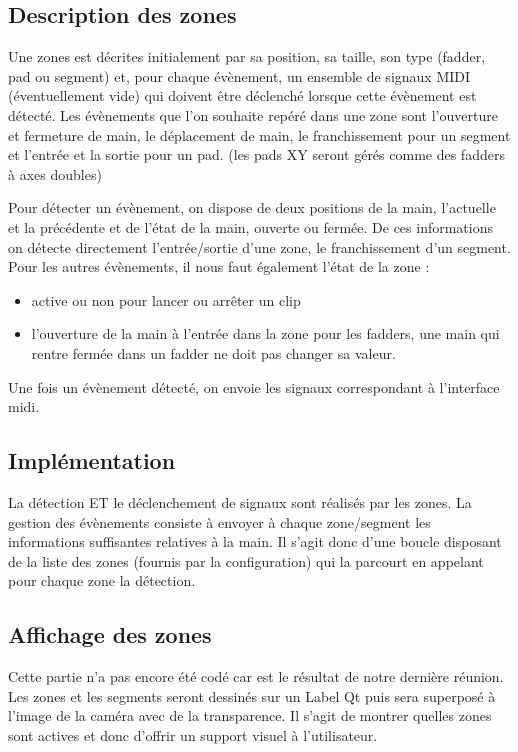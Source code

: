 \subsection{Description des zones}
\par Une zones est décrites initialement par sa position, sa taille, son type (fadder, pad ou segment) et, pour chaque évènement, un ensemble de signaux MIDI (éventuellement vide) qui doivent être déclenché lorsque cette évènement est détecté. Les évènements que l'on souhaite repéré dans une zone sont l'ouverture et fermeture de main, le déplacement de main, le franchissement pour un segment et l'entrée et la sortie pour un pad. (les pads XY seront gérés comme des fadders à axes doubles)
\par Pour détecter un évènement, on dispose de deux positions de la main, l'actuelle et la précédente et de l'état de la main, ouverte ou fermée. De ces informations on détecte directement l'entrée/sortie d'une zone, le franchissement d'un segment. Pour les autres évènements, il nous faut également l'état de la zone :
\begin{itemize}
    \item active ou non pour lancer ou arrêter un clip
    \item l'ouverture de la main à l'entrée dans la zone pour les fadders, une main qui rentre fermée dans un fadder ne doit pas changer sa valeur.
\end{itemize}
\par Une fois un évènement détecté, on envoie les signaux correspondant à l'interface midi.
\subsection{Implémentation}
\par La détection ET le déclenchement de signaux sont réalisés par les zones. La gestion des évènements consiste à envoyer à chaque zone/segment les informations suffisantes relatives à la main. Il s'agit donc d'une boucle disposant de la liste des zones (fournis par la configuration) qui la parcourt en appelant pour chaque zone la détection.
\subsection{Affichage des zones}
\par Cette partie n'a pas encore été codé car est le résultat de notre dernière réunion. Les zones et les segments seront dessinés sur un Label Qt puis sera superposé à l'image de la caméra avec de la transparence. Il s'agit de montrer quelles zones sont actives et donc d'offrir un support visuel à l'utilisateur. 

